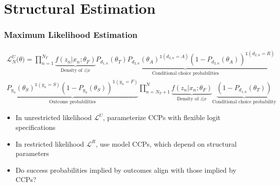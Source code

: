 \documentclass[12pt, aspectratio=169]{beamer}
\begin{document}
\section{Structural Estimation}
\addtocounter{framenumber}{-1}
\begin{frame}[label=mle]
\frametitle{Maximum Likelihood Estimation}
\begin{multline*}
\mathcal{L}_N^U\big(\theta\big) = \prod_{n=1}^{N_T}\underbrace{f(z_n|x_n;\theta_F)}_{\text{Density of $z|x$}}\underbrace{P_{d_{1,n}}(\theta_T)P_{d_{2,n}}(\theta_A)^{\mathds{1}(d_{2,n}=A)}(1-P_{d_{2,n}}(\theta_A))^{\mathds{1}(d_{2,n}=R)}}_{\text{Conditional choice probabilities}} \\
\underbrace{P_{y_n}(\theta_S)^{\mathds{1}(y_n=S)}(1-P_{y_n}(\theta_S))^{\mathds{1}(y_n=F)}}_{\text{Outcome probabilities}}\prod_{n=N_T+1}^N\underbrace{f(z_n|x_n;\theta_F)}_{\text{Density of $z|x$}}\underbrace{(1-P_{d_{1,n}}(\theta_T))}_{\text{Conditional choice probability}}
\end{multline*}
\begin{itemize}
\item In unrestricted likelihood $\mathcal{L}^U$, parameterize CCPs with flexible logit specifications
\vspace{5pt}
\item In restricted likelihood $\mathcal{L}^R$, use model CCPs, which depend on structural parameters\!\!
\vspace{5pt}
\item Do success probabilities implied by outcomes align with those implied by CCPs?
\vspace{10pt}
\end{itemize}
\hyperlink{ysl}{}
\hyperlink{wdl}{}
\end{frame}
\end{document}
